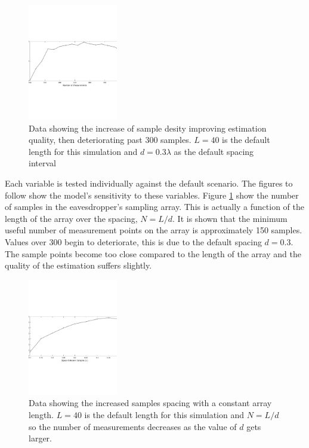 \documentclass{allertonproc}
\begin{document}
\begin{figure}[ht!]
\begin{center}
\includegraphics[height=2in]{numMeasurements}
\caption{Data showing the increase of sample desity improving estimation quality, then deteriorating past 300 samples. $L=40$ is the default length for this simulation and $d = 0.3\lambda$ as the default spacing interval}\label{N}
\end{center}
\end{figure}

Each variable is tested individually against the default scenario. The figures to follow show the model's sensitivity to these variables. Figure \ref{N} show the number of samples in the eavesdropper's sampling array. This is actually a function of the length of the array over the spacing, $N = L/d$. It is shown that the minimum useful number of measurement points on the array is approximately 150 samples. Values over 300 begin to deteriorate, this is due to the default spacing $d = 0.3$. The sample points become too close compared to the length of the array and the quality of the estimation suffers slightly. 
\begin{figure}[ht!]
\begin{center}
\includegraphics[height=2in]{wavelengths}
\caption{Data showing the increased samples spacing with a constant array length. $L=40$ is the default length for this simulation and $N = L/d$ so the number of measurements decreases as the value of $d$ gets larger.}\label{spacing}
\end{center}
\end{figure}
\end{document}
